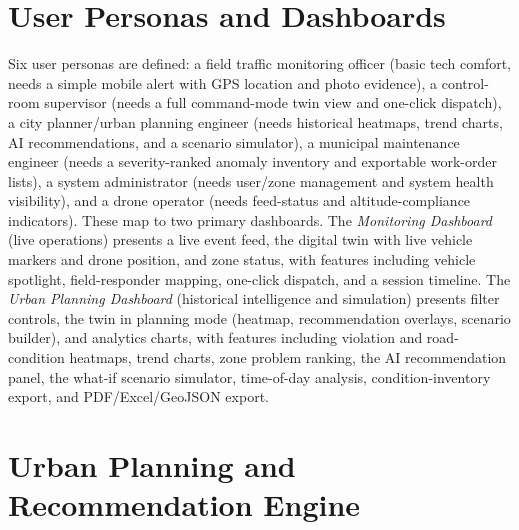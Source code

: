 \documentclass[conference]{IEEEtran}
\begin{document}
\section{User Personas and Dashboards}
\label{sec:dashboards}

Six user personas are defined: a field traffic monitoring officer (basic tech comfort, needs a simple mobile alert with GPS location and photo evidence), a control-room supervisor (needs a full command-mode twin view and one-click dispatch), a city planner/urban planning engineer (needs historical heatmaps, trend charts, AI recommendations, and a scenario simulator), a municipal maintenance engineer (needs a severity-ranked anomaly inventory and exportable work-order lists), a system administrator (needs user/zone management and system health visibility), and a drone operator (needs feed-status and altitude-compliance indicators). These map to two primary dashboards. The \textit{Monitoring Dashboard} (live operations) presents a live event feed, the digital twin with live vehicle markers and drone position, and zone status, with features including vehicle spotlight, field-responder mapping, one-click dispatch, and a session timeline. The \textit{Urban Planning Dashboard} (historical intelligence and simulation) presents filter controls, the twin in planning mode (heatmap, recommendation overlays, scenario builder), and analytics charts, with features including violation and road-condition heatmaps, trend charts, zone problem ranking, the AI recommendation panel, the what-if scenario simulator, time-of-day analysis, condition-inventory export, and PDF/Excel/GeoJSON export.

\section{Urban Planning and Recommendation Engine}
\label{sec:planning}
\end{document}

